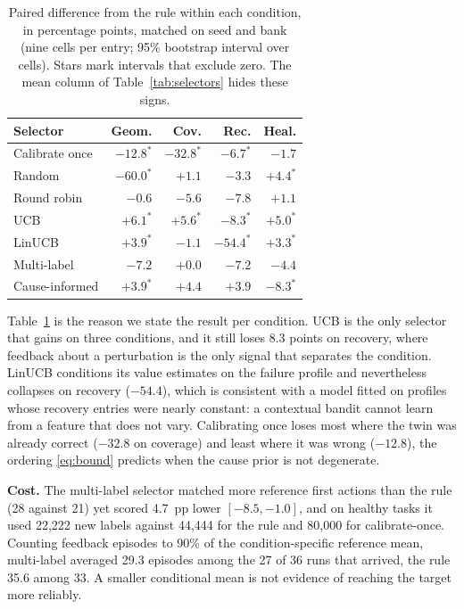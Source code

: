 \documentclass[conference]{IEEEtran}
\begin{document}
\begin{table}[t]
\centering\caption{Paired difference from the rule within each condition, in percentage points, matched on seed and bank (nine cells per entry; 95\% bootstrap interval over cells). Stars mark intervals that exclude zero. The mean column of Table~\ref{tab:selectors} hides these signs.}\label{tab:paired}
\setlength{\tabcolsep}{3.6pt}
\begin{tabular}{@{}lrrrr@{}}\toprule
Selector & Geom. & Cov. & Rec. & Heal.\\\midrule
Calibrate once & $-12.8^{*}$ & $-32.8^{*}$ & $-6.7^{*}$ & $-1.7$\\
Random & $-60.0^{*}$ & $+1.1$ & $-3.3$ & $+4.4^{*}$\\
Round robin & $-0.6$ & $-5.6$ & $-7.8$ & $+1.1$\\
UCB & $+6.1^{*}$ & $+5.6^{*}$ & $-8.3^{*}$ & $+5.0^{*}$\\
LinUCB & $+3.9^{*}$ & $-1.1$ & $-54.4^{*}$ & $+3.3^{*}$\\
Multi-label & $-7.2$ & $+0.0$ & $-7.2$ & $-4.4$\\
Cause-informed & $+3.9^{*}$ & $+4.4$ & $+3.9$ & $-8.3^{*}$\\\bottomrule
\end{tabular}
\end{table}
Table~\ref{tab:paired} is the reason we state the result per condition. UCB is the only selector that gains on three conditions, and it still loses 8.3 points on recovery, where feedback about a perturbation is the only signal that separates the condition. LinUCB conditions its value estimates on the failure profile and nevertheless collapses on recovery ($-54.4$), which is consistent with a model fitted on profiles whose recovery entries were nearly constant: a contextual bandit cannot learn from a feature that does not vary. Calibrating once loses most where the twin was already correct ($-32.8$ on coverage) and least where it was wrong ($-12.8$), the ordering \eqref{eq:bound} predicts when the cause prior is not degenerate.

\textbf{Cost.} The multi-label selector matched more reference first actions than the rule (28 against 21) yet scored 4.7~pp lower $[-8.5,-1.0]$, and on healthy tasks it used 22,222 new labels against 44,444 for the rule and 80,000 for calibrate-once. Counting feedback episodes to 90\% of the condition-specific reference mean, multi-label averaged 29.3 episodes among the 27 of 36 runs that arrived, the rule 35.6 among 33. A smaller conditional mean is not evidence of reaching the target more reliably.
\end{document}
